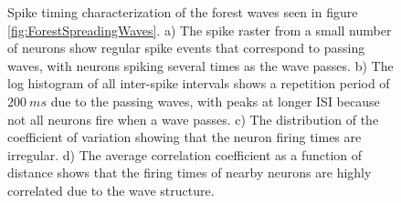 \begin{figure}[!htb]
 \caption{Spike timing characterization of the forest waves seen in figure \ref{fig:ForestSpreadingWaves}.
          a) The spike raster from a small number of neurons show regular spike events that correspond to passing waves, with neurons spiking several times as the wave passes.
          b) The log histogram of all inter-spike intervals shows a repetition period of $200~ms$ due to the passing waves, 
             with peaks at longer ISI because not all neurons fire when a wave passes. 
          c) The distribution of the coefficient of variation showing that the neuron firing times are irregular.
          d) The average correlation coefficient as a function of distance shows that the firing times of nearby neurons are highly correlated due to the wave structure.
          } 
 \label{fig:ForestWave_SpikeTiming}
\end{figure}
 \FloatBarrier
 

\endinput

